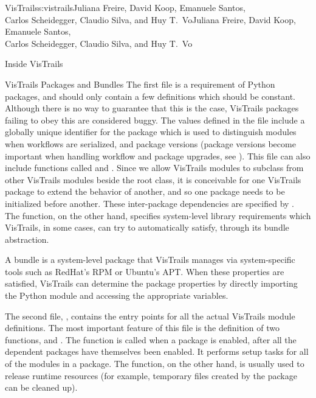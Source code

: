 \begin{aosachaptertoc}{VisTrails}{s:vistrails}{Juliana Freire, David Koop, Emanuele Santos, \\ Carlos Scheidegger, Claudio Silva, and Huy T.\ Vo}{Juliana Freire, David Koop, Emanuele Santos, \\ \hspace*{0.9cm} Carlos Scheidegger, Claudio Silva, and Huy T.\ Vo}
\begin{aosasect1}{Inside VisTrails}
\begin{aosasect2}{VisTrails Packages and Bundles}
The first file  is a requirement of Python
packages, and should only contain a few definitions which should be
constant. Although there is no way to guarantee that this is the case,
VisTrails packages failing to obey this are considered buggy. The
values defined in the file include a globally unique identifier for
the package which is used to distinguish modules when workflows are
serialized, and package versions (package versions become important
when handling workflow and package upgrades, see
). This file can also include
functions called  and
. Since we allow VisTrails modules to
subclass from other VisTrails modules beside the root 
class, it is conceivable for one VisTrails package to extend the
behavior of another, and so one package needs to be initialized before
another. These inter-package dependencies are specified by
. The 
function, on the other hand, specifies system-level library
requirements which VisTrails, in some cases, can try to automatically
satisfy, through its bundle abstraction.

A bundle is a system-level package that VisTrails manages via
system-specific tools such as RedHat's RPM or Ubuntu's APT\@.  When
these properties are satisfied, VisTrails can determine the package
properties by directly importing the Python module and accessing the
appropriate variables.

The second file, , contains the entry points for all the
actual VisTrails module definitions. The most important feature of
this file is the definition of two functions,  and
. The  function is called when a
package is enabled, after all the dependent packages have themselves
been enabled. It performs setup tasks for all of the modules in a
package. The  function, on the other hand, is usually
used to release runtime resources (for example, temporary files
created by the package can be cleaned up).


\end{aosasect2}
\end{aosasect1}
\end{aosachaptertoc}
